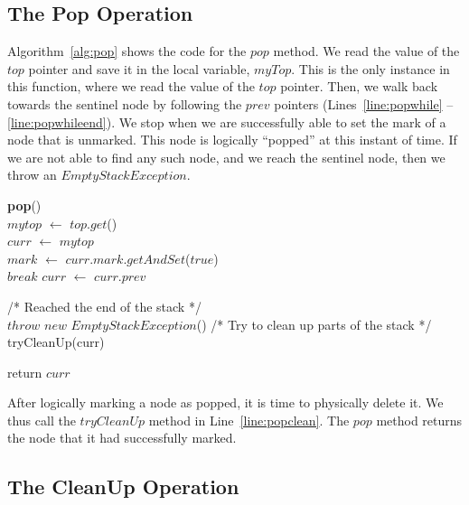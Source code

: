 \documentclass{llncs}
\begin{document}
\vspace{-3mm} 
\subsection{The Pop Operation}
Algorithm~\ref{alg:pop} shows the code for the $pop$ method. We read the value of 
the $top$ pointer and save it in the local variable, $myTop$. This is the only instance
in this function, where we read the value of the $top$ pointer. Then, we walk back
towards the sentinel node by following the $prev$ pointers (Lines~\ref{line:popwhile} --
\ref{line:popwhileend}). We stop when we are successfully able to set the mark of a node
that is unmarked. This node is logically ``popped'' at this instant of time. 
If we are not able to find any such node, and we reach the sentinel node, then we throw
an $EmptyStackException$. 

\vspace{-6mm}
\begin{algorithm}[!htb]
\scriptsize
\SetAlgoLined

\textbf{pop}(){}\\
	$mytop$  $\leftarrow$  $top.get$()\\ \label{alg:prev_top}
	$curr$  $\leftarrow$  $mytop$\\
	\label{alg:while_mark}
	  {  \label{line:popwhile} 
			$mark$  $\leftarrow$ $curr.mark.getAndSet$($true$)\\  
			{
				$break$
			}
			$curr$  $\leftarrow$ $curr.prev$
	} \label{line:popwhileend}

	{
/* Reached the end of the stack */ \\
			$throw$ $new$ $EmptyStackException$() 
	}
/* Try to clean up parts of the stack */ \\
	tryCleanUp(curr) \label{line:popclean}

	return $curr$
\caption{The Pop Method} \label{alg:pop}
\end{algorithm}
\vspace{-6mm}

After logically marking a node as popped, it is time to physically delete it. We thus
call the $tryCleanUp$ method in Line~\ref{line:popclean}. The $pop$ method returns the
node that it had successfully marked.
\vspace{-3mm}
\subsection{The CleanUp Operation}
\end{document}
